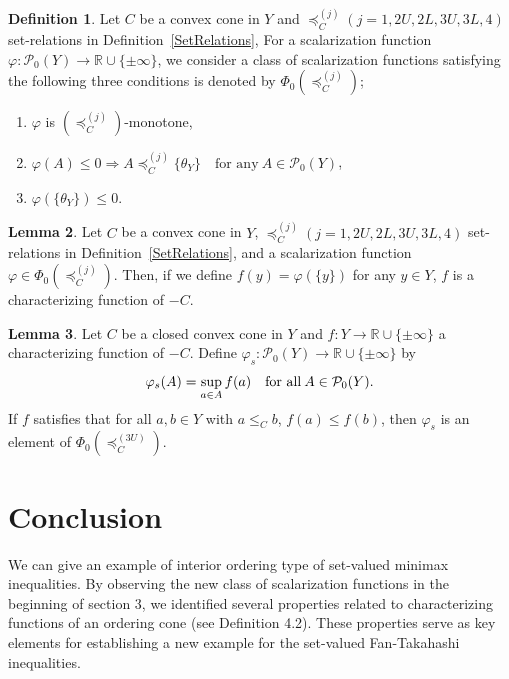 \documentclass[a4paper,11pt]{jsarticle}
\theoremstyle{definition}
\newtheorem{dfn}{Definition}[section]
\newtheorem{lem}[dfn]{Lemma}
\newcommand{\rnum}{\mathbb{R}}
\newcommand{\pow}[1]{\mathcal{P}_{0}(#1)}
\newcommand{\bleq}[1]{\leq_{#1}\!}
\newcommand{\setrel}[2]{\preccurlyeq^{(#1)}_{#2}\!}
\begin{document}
\begin{dfn}\label{Scalarization3ConditionsDefinition}
  Let $C$ be a convex cone in $Y$ and
  $\setrel{j}{C} (j= 1, 2U, 2L, 3U, 3L, 4)$ set-relations in Definition~\ref{SetRelations},
  For a scalarization function $\varphi: \pow{Y} \to \rnum \cup \{\pm \infty\}$,
  we consider a class of scalarization functions satisfying the
  following three conditions is denoted by $\Phi_0(\setrel{j}{C})$;
  \begin{enumerate}
    \item $\varphi$ is $(\setrel{j}{C})$-monotone,
    \item $\varphi (A) \leq 0 \Rightarrow  A \setrel{j}{C} \{\theta_Y\}\quad\text{for any}\:A\in \pow{Y}$,
    \item $\varphi(\{\theta_{Y}\}) \leq 0$.
  \end{enumerate}
\end{dfn}

\begin{lem}
  Let $C$ be a convex cone in $Y$,
  $\setrel{j}{C} (j= 1, 2U, 2L, 3U, 3L, 4)$ set-relations in Definition~\ref{SetRelations},
  and a scalarization function $\varphi \in \Phi_0(\setrel{j}{C})$.
  Then, if we define $f(y) = \varphi (\{y\})$ for any $y \in Y$,
  $f$ is a characterizing function of $-C$.
\end{lem}

\begin{lem}
  Let $C$ be a closed convex cone in $Y$ and $f: Y \to \rnum \cup \{\pm \infty\}$
  a characterizing function of $-C$. Define $\varphi_s : \pow{Y} \to \rnum \cup \{\pm \infty\}$ by
  \begin{equation}
    \varphi_s (A) = \sup_{a \in A} f(a) \quad \text{for all}\: A \in \pow{Y}. \notag
  \end{equation}
  If $f$ satisfies that for all $a, b \in Y$ with $a \bleq{C} b$, $f(a) \leq f(b)$,
  then $\varphi_s$ is an element of $\Phi_0(\setrel{3U}{C})$.
\end{lem}

\section{\rm Conclusion}


We can give an example of interior ordering type of set-valued minimax
inequalities.
By observing the new class of scalarization functions in the beginning of section 3,
we identified several properties related to characterizing functions of an ordering cone (see Definition 4.2).
These properties serve as key elements for establishing a new example for the
set-valued Fan-Takahashi inequalities.
\end{document}
